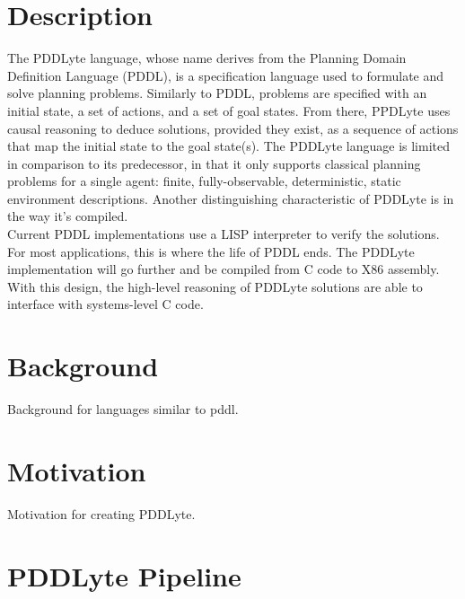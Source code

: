 \documentclass[
a4paper, %
11pt, %
onecolumn, %
openany, %
]{memoir}
\begin{document}

\section{Description}
{\setlength{\parindent}{0cm}

The PDDLyte language, whose name derives from the Planning Domain Definition Language (PDDL)\cite{pddl98}, is a specification language used to formulate and solve planning problems. Similarly to PDDL, problems are specified with an initial state, a set of actions, and a set of goal states. From there, PPDLyte uses causal reasoning to deduce solutions, provided they exist, as a sequence of actions that map the initial state to the goal state(s). The PDDLyte language is limited in comparison to its predecessor, in that it only supports classical planning problems for a single agent: finite, fully-observable, deterministic, static environment descriptions. Another distinguishing characteristic of PDDLyte is in the way it's compiled.\\

Current PDDL implementations use a LISP interpreter to verify the solutions. For most applications, this is where the life of PDDL ends. The PDDLyte implementation will go further and be compiled from C code to X86 assembly. With this design, the high-level reasoning of PDDLyte solutions are able to interface with systems-level C code.
}


\section{Background}
Background for languages similar to pddl.


\section{Motivation}
Motivation for creating PDDLyte.


\section{PDDLyte Pipeline}
\end{document}
